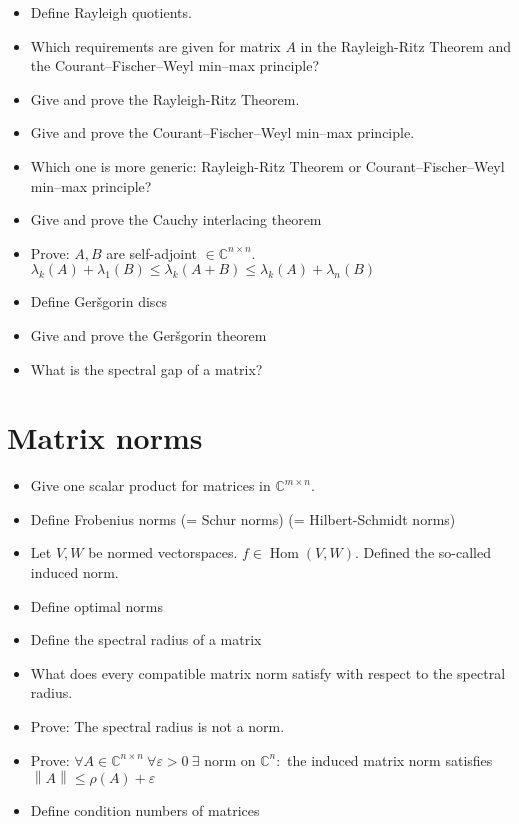 \documentclass[a4paper]{article}
\newcommand{\norm}[1]{\left\|#1\right\|}
\begin{document}
\begin{itemize}
  \item Define Rayleigh quotients.
  \item Which requirements are given for matrix $A$ in the Rayleigh-Ritz Theorem and the Courant--Fischer--Weyl min--max principle?
  \item Give and prove the Rayleigh-Ritz Theorem.
  \item Give and prove the Courant--Fischer--Weyl min--max principle.
  \item Which one is more generic: Rayleigh-Ritz Theorem or Courant--Fischer--Weyl min--max principle?
  \item Give and prove the Cauchy interlacing theorem
  \item Prove: $A, B$ are self-adjoint $\in \mathbb C^{n \times n}$. $\lambda_{k}(A) + \lambda_1(B) \leq \lambda_k(A + B) \leq \lambda_k(A) + \lambda_n(B)$
  \item Define Ger\v{s}gorin discs
  \item Give and prove the Ger\v{s}gorin theorem
  \item What is the spectral gap of a matrix?
\end{itemize}

\section{Matrix norms}

\begin{itemize}
  \item Give one scalar product for matrices in $\mathbb C^{m \times n}$.
  \item Define Frobenius norms (= Schur norms) (= Hilbert-Schmidt norms)
  \item Let $V, W$ be normed vectorspaces. $f \in \operatorname{Hom}(V, W)$. Defined the so-called induced norm.
  \item Define optimal norms
  \item Define the spectral radius of a matrix
  \item What does every compatible matrix norm satisfy with respect to the spectral radius.
  \item Prove: The spectral radius is not a norm.
  \item Prove: $\forall A \in \mathbb C^{n \times n} \: \forall \varepsilon > 0 \:\exists \text{ norm on } \mathbb C^n:$ the induced matrix norm satisfies $\norm{A} \leq \rho(A) + \varepsilon$
  \item Define condition numbers of matrices
\end{itemize}
\end{document}
